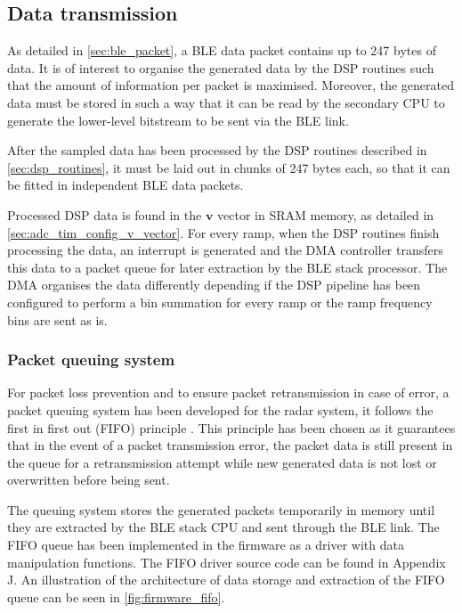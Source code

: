 \subsection{Data transmission} \label{sec:data_transmission}

As detailed in \cref{sec:ble_packet}, a BLE data packet contains up to 247 bytes of data. It is of interest to organise the generated data by the DSP routines such that the amount of information per packet is maximised. Moreover, the generated data must be stored in such a way that it can be read by the secondary CPU to generate the lower-level bitstream to be sent via the BLE link.

After the sampled data has been processed by the DSP routines described in \cref{sec:dsp_routines}, it must be laid out in chunks of 247 bytes each, so that it can be fitted in independent BLE data packets.

Processed DSP data is found in the $\mathbf{v}$ vector in SRAM memory, as detailed in \cref{sec:adc_tim_config_v_vector}. For every ramp, when the DSP routines finish processing the data, an interrupt is generated and the DMA controller transfers this data to a packet queue for later extraction by the BLE stack processor. The DMA organises the data differently depending if the DSP pipeline has been configured to perform a bin summation for every ramp or the ramp frequency bins are sent as is.

\subsubsection{Packet queuing system}

For packet loss prevention and to ensure packet retransmission in case of error, a packet queuing system has been developed for the radar system, it follows the first in first out (FIFO) principle \cite{Tanenbaum2015,Kurose2006}. This principle has been chosen as it guarantees that in the event of a packet transmission error, the packet data is still present in the queue for a retransmission attempt while new generated data is not lost or overwritten before being sent.

The queuing system stores the generated packets temporarily in memory until they are extracted by the BLE stack CPU and sent through the BLE link. The FIFO queue has been implemented in the firmware as a driver with data manipulation functions. The FIFO driver source code can be found in Appendix J. An illustration of the architecture of data storage and extraction of the FIFO queue can be seen in \cref{fig:firmware_fifo}.


